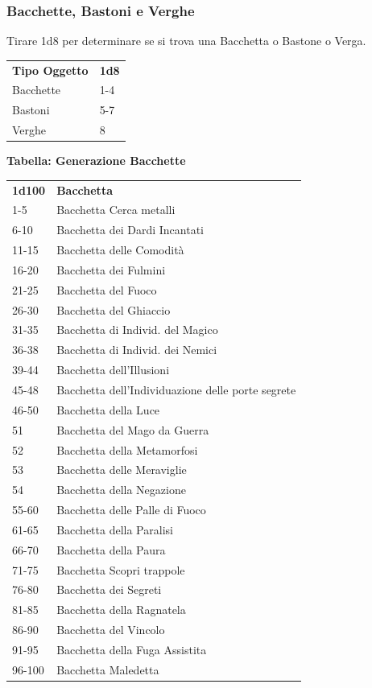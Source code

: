 \begin{multicols}{2}
\subsubsection{Bacchette, Bastoni e Verghe}

Tirare 1d8 per determinare se si trova una Bacchetta o Bastone o Verga.

\medskip

\begin{tabular}{ll}\\
\textbf{Tipo Oggetto}&\textbf{1d8}\\
Bacchette&1-4\\
Bastoni&5-7\\
Verghe&8\\
\end{tabular}

\medskip

\textbf{Tabella: Generazione Bacchette}

\medskip

\begin{tabularx}{0.45\textwidth}{lX}
\textbf{1d100} & \textbf{Bacchetta}\\
1-5& Bacchetta Cerca metalli\\
6-10 &Bacchetta dei Dardi Incantati\\
11-15 &Bacchetta delle Comodità\\
16-20 &Bacchetta dei Fulmini\\
21-25& Bacchetta del Fuoco\\
26-30& Bacchetta del Ghiaccio\\
31-35& Bacchetta di Individ. del Magico\\
36-38& Bacchetta di Individ. dei Nemici\\
39-44& Bacchetta dell'Illusioni\\
45-48& Bacchetta dell'Individuazione delle porte segrete\\
46-50& Bacchetta della Luce\\
51 &Bacchetta del Mago da Guerra\\
52 &Bacchetta della Metamorfosi\\
53 &Bacchetta delle Meraviglie\\
54 &Bacchetta della Negazione\\
55-60& Bacchetta delle Palle di Fuoco\\
61-65 &Bacchetta della Paralisi\\
66-70& Bacchetta della Paura\\
71-75 &Bacchetta Scopri trappole\\
76-80& Bacchetta dei Segreti\\
81-85& Bacchetta della Ragnatela\\
86-90& Bacchetta del Vincolo\\
91-95& Bacchetta della Fuga Assistita\\
96-100&Bacchetta Maledetta\\
\end{tabularx}


\end{multicols}
